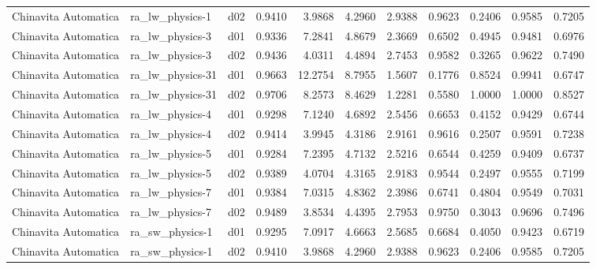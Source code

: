 \begin{longtable}{lllrrrrrrrr}
 Chinavita Automatica  &       ra\_lw\_physics-1 &     d02 &   0.9410 &   3.9868 &   4.2960 &       2.9388 &        0.9623 &       0.2406 &           0.9585 &  0.7205 \\
 Chinavita Automatica  &       ra\_lw\_physics-3 &     d01 &   0.9336 &   7.2841 &   4.8679 &       2.3669 &        0.6502 &       0.4945 &           0.9481 &  0.6976 \\
 Chinavita Automatica  &       ra\_lw\_physics-3 &     d02 &   0.9436 &   4.0311 &   4.4894 &       2.7453 &        0.9582 &       0.3265 &           0.9622 &  0.7490 \\
 Chinavita Automatica  &      ra\_lw\_physics-31 &     d01 &   0.9663 &  12.2754 &   8.7955 &       1.5607 &        0.1776 &       0.8524 &           0.9941 &  0.6747 \\
 Chinavita Automatica  &      ra\_lw\_physics-31 &     d02 &   0.9706 &   8.2573 &   8.4629 &       1.2281 &        0.5580 &       1.0000 &           1.0000 &  0.8527 \\
 Chinavita Automatica  &       ra\_lw\_physics-4 &     d01 &   0.9298 &   7.1240 &   4.6892 &       2.5456 &        0.6653 &       0.4152 &           0.9429 &  0.6744 \\
 Chinavita Automatica  &       ra\_lw\_physics-4 &     d02 &   0.9414 &   3.9945 &   4.3186 &       2.9161 &        0.9616 &       0.2507 &           0.9591 &  0.7238 \\
 Chinavita Automatica  &       ra\_lw\_physics-5 &     d01 &   0.9284 &   7.2395 &   4.7132 &       2.5216 &        0.6544 &       0.4259 &           0.9409 &  0.6737 \\
 Chinavita Automatica  &       ra\_lw\_physics-5 &     d02 &   0.9389 &   4.0704 &   4.3165 &       2.9183 &        0.9544 &       0.2497 &           0.9555 &  0.7199 \\
 Chinavita Automatica  &       ra\_lw\_physics-7 &     d01 &   0.9384 &   7.0315 &   4.8362 &       2.3986 &        0.6741 &       0.4804 &           0.9549 &  0.7031 \\
 Chinavita Automatica  &       ra\_lw\_physics-7 &     d02 &   0.9489 &   3.8534 &   4.4395 &       2.7953 &        0.9750 &       0.3043 &           0.9696 &  0.7496 \\
 Chinavita Automatica  &       ra\_sw\_physics-1 &     d01 &   0.9295 &   7.0917 &   4.6663 &       2.5685 &        0.6684 &       0.4050 &           0.9423 &  0.6719 \\
 Chinavita Automatica  &       ra\_sw\_physics-1 &     d02 &   0.9410 &   3.9868 &   4.2960 &       2.9388 &        0.9623 &       0.2406 &           0.9585 &  0.7205 \\

\end{longtable}
